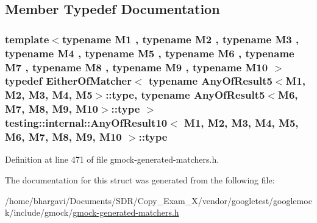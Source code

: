 \subsection{Member Typedef Documentation}
\subsubsection[{\texorpdfstring{type}{type}}]{\setlength{\rightskip}{0pt plus 5cm}template$<$typename M1 , typename M2 , typename M3 , typename M4 , typename M5 , typename M6 , typename M7 , typename M8 , typename M9 , typename M10 $>$ typedef {\bf Either\+Of\+Matcher}$<$ typename {\bf Any\+Of\+Result5}$<$M1, M2, M3, M4, M5$>$\+::{\bf type}, typename {\bf Any\+Of\+Result5}$<$M6, M7, M8, M9, M10$>$\+::{\bf type} $>$ {\bf testing\+::internal\+::\+Any\+Of\+Result10}$<$ M1, M2, M3, M4, M5, M6, M7, M8, M9, M10 $>$\+::{\bf type}}\hypertarget{structtesting_1_1internal_1_1_any_of_result10_aa1cb3d733f29716f2015db8a2b6c1c94}{}\label{structtesting_1_1internal_1_1_any_of_result10_aa1cb3d733f29716f2015db8a2b6c1c94}


Definition at line 471 of file gmock-\/generated-\/matchers.\+h.



The documentation for this struct was generated from the following file\+:\begin{DoxyCompactItemize}
\item 
/home/bhargavi/\+Documents/\+S\+D\+R/\+Copy\+\_\+\+Exam\+\_\+X/vendor/googletest/googlemock/include/gmock/\hyperlink{gmock-generated-matchers_8h}{gmock-\/generated-\/matchers.\+h}\end{DoxyCompactItemize}
